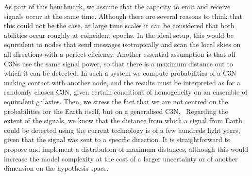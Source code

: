 \documentclass[crop]{CSLB}
\newcommand{\ceti}{C3N}
\newcommand{\cetis}{C3Ns}
\begin{document}
As part of this benchmark, we assume that the capacity to emit and receive signals occur at the same time.
%
Although there are several reasons to think that this could not be the case, at large time scales it can be considered that both abilities occur roughly at coincident epochs.
%
In the ideal setup, this would be equivalent to nodes that send messages isotropically and scan the local skies on all directions with a perfect eficiency.
%
Another essential assumption is that all \cetis{} use the same signal power, so that there is a maximum distance out to which it can be detected.
%
%
In such a system we compute probabilities of a \ceti{} making contact with another node, and the results must be interpreted as for a randomly chosen \ceti{}, given certain conditions of homogeneity on an ensemble of equivalent galaxies.
%
Then, we stress the fact that we are not centred on the probabilities for the Earth itself, but on a generalised \ceti{}. 
%
Regarding the extent of the signals, we know that the distance from which a signal from Earth could be detected using the current technology is of a few hundreds light years, given that the signal was sent to a specific direction.
%
It is straightforward to propose and implement a distribution of maximum distances, although this would increase the model complexity at the cost of a larger uncertainty or of another dimension on the hypothesis space.    



%
%
\end{document}
